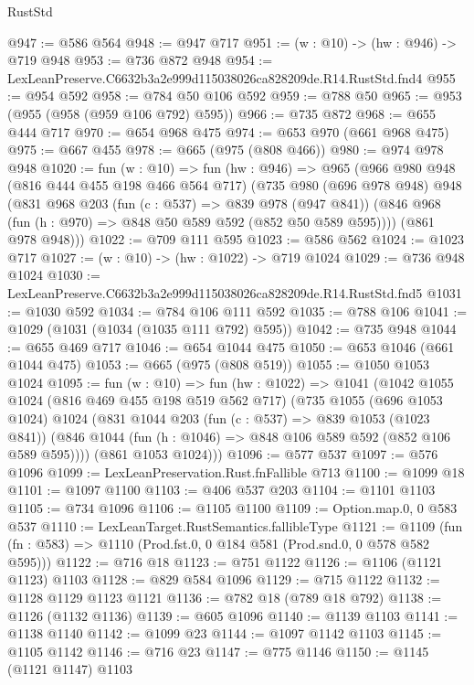 \begin{lexlean}{RustStd}
\begin{coremodule}
@947 := @586 @564
@948 := @947 @717
@951 := (w : @10) -> (hw : @946) -> @719 @948
@953 := @736 @872 @948
@954 := LexLeanPreserve.C6632b3a2e999d115038026ca828209de.R14.RustStd.fnd4
@955 := @954 @592
@958 := @784 @50 @106 @592
@959 := @788 @50
@965 := @953 (@955 (@958 (@959 @106 @792) @595))
@966 := @735 @872
@968 := @655 @444 @717
@970 := @654 @968 @475
@974 := @653 @970 (@661 @968 @475)
@975 := @667 @455
@978 := @665 (@975 (@808 @466))
@980 := @974 @978 @948
@1020 := fun (w : @10) =>
  fun (hw : @946) =>
  @965
    (@966
      @980
      @948
      (@816 @444 @455 @198 @466 @564 @717)
      (@735
        @980
        (@696 @978 @948)
        @948
        (@831
          @968
          @203
          (fun (c : @537) => @839 @978 (@947 @841))
          (@846 @968 (fun (h : @970) => @848 @50 @589 @592 (@852 @50 @589 @595))))
        (@861 @978 @948)))
@1022 := @709 @111 @595
@1023 := @586 @562
@1024 := @1023 @717
@1027 := (w : @10) -> (hw : @1022) -> @719 @1024
@1029 := @736 @948 @1024
@1030 := LexLeanPreserve.C6632b3a2e999d115038026ca828209de.R14.RustStd.fnd5
@1031 := @1030 @592
@1034 := @784 @106 @111 @592
@1035 := @788 @106
@1041 := @1029 (@1031 (@1034 (@1035 @111 @792) @595))
@1042 := @735 @948
@1044 := @655 @469 @717
@1046 := @654 @1044 @475
@1050 := @653 @1046 (@661 @1044 @475)
@1053 := @665 (@975 (@808 @519))
@1055 := @1050 @1053 @1024
@1095 := fun (w : @10) =>
  fun (hw : @1022) =>
  @1041
    (@1042
      @1055
      @1024
      (@816 @469 @455 @198 @519 @562 @717)
      (@735
        @1055
        (@696 @1053 @1024)
        @1024
        (@831
          @1044
          @203
          (fun (c : @537) => @839 @1053 (@1023 @841))
          (@846 @1044 (fun (h : @1046) => @848 @106 @589 @592 (@852 @106 @589 @595))))
        (@861 @1053 @1024)))
@1096 := @577 @537
@1097 := @576 @1096
@1099 := LexLeanPreservation.Rust.fnFallible @713
@1100 := @1099 @18
@1101 := @1097 @1100
@1103 := @406 @537 @203
@1104 := @1101 @1103
@1105 := @734 @1096
@1106 := @1105 @1100
@1109 := Option.map.{0, 0} @583 @537
@1110 := LexLeanTarget.RustSemantics.fallibleType
@1121 := @1109
    (fun (fn : @583) => @1110 (Prod.fst.{0, 0} @184 @581 (Prod.snd.{0, 0} @578 @582 @595)))
@1122 := @716 @18
@1123 := @751 @1122
@1126 := @1106 (@1121 @1123) @1103
@1128 := @829 @584 @1096
@1129 := @715 @1122
@1132 := @1128 @1129 @1123 @1121
@1136 := @782 @18 (@789 @18 @792)
@1138 := @1126 (@1132 @1136)
@1139 := @605 @1096
@1140 := @1139 @1103
@1141 := @1138 @1140
@1142 := @1099 @23
@1144 := @1097 @1142 @1103
@1145 := @1105 @1142
@1146 := @716 @23
@1147 := @775 @1146
@1150 := @1145 (@1121 @1147) @1103

\end{coremodule}
\end{lexlean}

